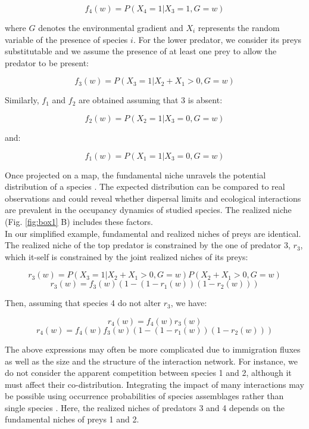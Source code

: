 \[f_4(w)=P(X_4=1|X_3=1, G=w)\]

where \(G\) denotes the environmental gradient and \(X_i\) represents
the random variable of the presence of species \(i\). For the lower
predator, we consider its preys substitutable and we assume the presence
of at least one prey to allow the predator to be present:

\[f_3(w)=P(X_3=1|X_2+X_1>0, G=w)\]

Similarly, \(f_1\) and \(f_2\) are obtained assuming that 3 is absent:

\[f_2(w)=P(X_2=1|X_3=0, G=w)\]

and:

\[f_1(w)=P(X_1=1|X_3=0, G=w)\]

Once projected on a map, the fundamental niche unravels the potential
distribution of a species \citep{Kearney2004}. The expected distribution
can be compared to real observations and could reveal whether dispersal
limits and ecological interactions are prevalent in the occupancy
dynamics of studied species. The realized niche (Fig. \ref{fig:box1} B)
includes these factors.\\
In our simplified example, fundamental and realized niches of preys are
identical. The realized niche of the top predator is constrained by the
one of predator 3, \(r_3\), which it-self is constrained by the joint
realized niches of its preys:

\[r_3(w)=P(X_3=1|X_2+X_1>0, G=w)P(X_2+X_1>0, G=w)\]
\[r_3(w)=f_3(w)\left(1-(1-r_1(w))(1-r_2(w))\right)\]

Then, assuming that species 4 do not alter \(r_3\), we have:

\[r_4(w)=f_4(w)r_3(w)\]
\[r_4(w)=f_4(w)f_3(w)\left(1-(1-r_1(w))(1-r_2(w))\right)\]

The above expressions may often be more complicated due to immigration
fluxes as well as the size and the structure of the interaction network.
For instance, we do not consider the apparent competition between
species 1 and 2, although it must affect their co-distribution.
Integrating the impact of many interactions may be possible using
occurrence probabilities of species assemblages rather than single
species \citep{Cazelles2016}. Here, the realized niches of predators 3
and 4 depends on the fundamental niches of preys 1 and 2.

